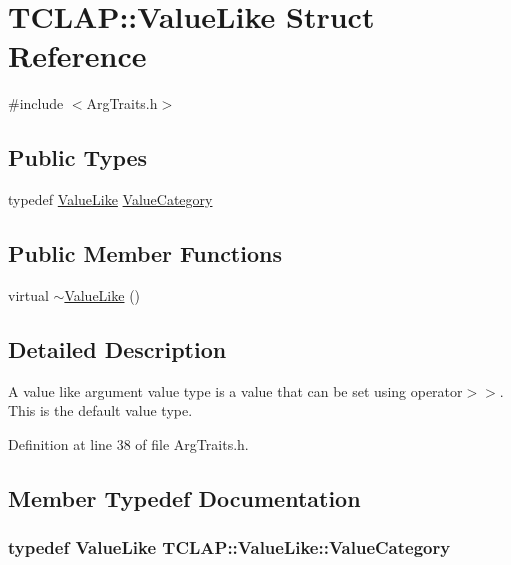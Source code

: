 \hypertarget{struct_t_c_l_a_p_1_1_value_like}{}\section{T\+C\+L\+A\+P\+:\+:Value\+Like Struct Reference}
\label{struct_t_c_l_a_p_1_1_value_like}


{\ttfamily \#include $<$Arg\+Traits.\+h$>$}

\subsection*{Public Types}
\begin{DoxyCompactItemize}
\item 
typedef \hyperlink{struct_t_c_l_a_p_1_1_value_like}{Value\+Like} \hyperlink{struct_t_c_l_a_p_1_1_value_like_a26e6d3b8c4a608ecebe7404e42fbecf9}{Value\+Category}
\end{DoxyCompactItemize}
\subsection*{Public Member Functions}
\begin{DoxyCompactItemize}
\item 
virtual \hyperlink{struct_t_c_l_a_p_1_1_value_like_aef7da69a6268964f450cf4c12e614ba7}{$\sim$\+Value\+Like} ()
\end{DoxyCompactItemize}


\subsection{Detailed Description}
A value like argument value type is a value that can be set using operator$>$$>$. This is the default value type. 

Definition at line 38 of file Arg\+Traits.\+h.



\subsection{Member Typedef Documentation}
\hypertarget{struct_t_c_l_a_p_1_1_value_like_a26e6d3b8c4a608ecebe7404e42fbecf9}{}
\subsubsection[{Value\+Category}]{\setlength{\rightskip}{0pt plus 5cm}typedef {\bf Value\+Like} {\bf T\+C\+L\+A\+P\+::\+Value\+Like\+::\+Value\+Category}}\label{struct_t_c_l_a_p_1_1_value_like_a26e6d3b8c4a608ecebe7404e42fbecf9}



